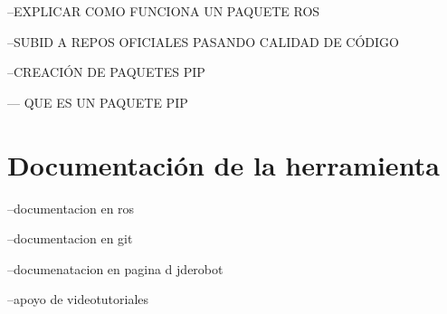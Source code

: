 --EXPLICAR COMO FUNCIONA UN PAQUETE ROS

--SUBID A REPOS OFICIALES PASANDO CALIDAD DE CÓDIGO

--CREACIÓN DE PAQUETES PIP

--- QUE ES UN PAQUETE PIP


\section{Documentación de la herramienta}
\label{sec:documentacion}

--documentacion en ros

--documentacion en git

--documenatacion en pagina d jderobot

--apoyo de videotutoriales
